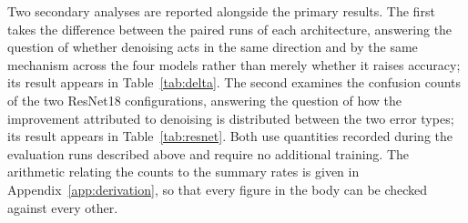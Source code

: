 Two secondary analyses are reported alongside the primary results. The first
takes the difference between the paired runs of each architecture, answering
the question of whether denoising acts in the same direction and by the same
mechanism across the four models rather than merely whether it raises
accuracy; its result appears in Table~\ref{tab:delta}. The second examines
the confusion counts of the two ResNet18 configurations, answering the
question of how the improvement attributed to denoising is distributed
between the two error types; its result appears in Table~\ref{tab:resnet}.
Both use quantities recorded during the
evaluation runs described above and require no additional training. The
arithmetic relating the counts to the summary rates is given in
Appendix~\ref{app:derivation}, so that every figure in the body can be
checked against every other.
